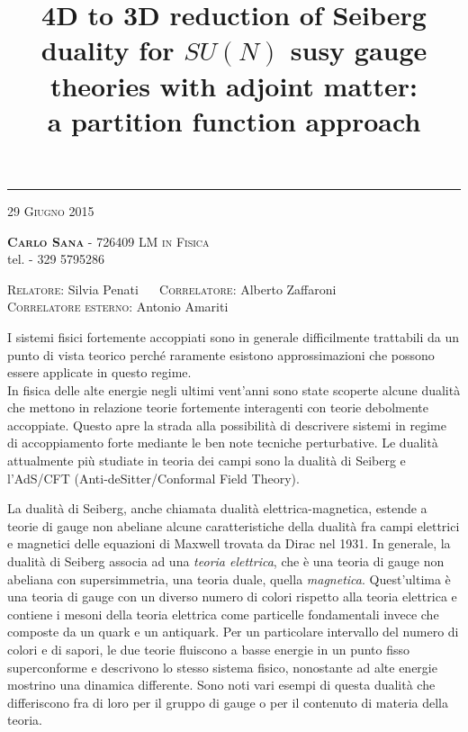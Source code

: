 \documentclass[a4paper,oneside,11pt]{article}
\date{}
\title{\boldmath \textbf{4D to 3D reduction of Seiberg duality for $SU(N)$ susy gauge theories with adjoint matter: \\  a partition function approach }
 }
\author{}
\begin{document}
\maketitle
\vspace*{-2.3cm}

\begin{center}
\rule{\textwidth}{0.5pt}
\scshape {29 Giugno 2015} \\
 \end{center}
\vspace{-0.3cm}
	 \textbf{\noindent%
	 \scshape%
	 Carlo Sana} - \textsf{726409}  \hfill
 {\scshape LM in Fisica} 
\\
 \noindent tel. \textsf{- 329 5795286}\\
 \vspace{-0.5cm}
\begin{center}
{ \scshape  Relatore}: 
\textsf{Silvia Penati} 
~~
{ \scshape  Correlatore}:
\textsf{Alberto Zaffaroni}
\\
{ \scshape  Correlatore esterno}:
\textsf{Antonio Amariti}

\end{center}

I sistemi fisici fortemente accoppiati sono in generale difficilmente trattabili da un punto di vista teorico perché raramente esistono approssimazioni che possono essere applicate in questo regime.\\
In fisica delle alte energie negli ultimi vent'anni sono state scoperte alcune dualità che mettono in relazione teorie fortemente interagenti con teorie debolmente accoppiate.
Questo apre la strada alla possibilità di descrivere sistemi in regime di accoppiamento forte mediante le ben note tecniche perturbative.
Le dualità attualmente più studiate in teoria dei campi sono la dualità di Seiberg e l'AdS/CFT (Anti-deSitter/Conformal Field Theory).

La dualità di Seiberg, anche chiamata dualità elettrica-magnetica, estende a teorie di gauge non abeliane alcune caratteristiche della dualità fra campi elettrici e magnetici delle equazioni di Maxwell trovata da Dirac nel 1931. 
In generale, la dualità di Seiberg associa ad una \emph{teoria elettrica}, che è una teoria di gauge non abeliana con supersimmetria, una teoria duale, quella \emph{magnetica}.
Quest'ultima è una teoria di gauge con un diverso numero di colori rispetto alla teoria elettrica e contiene i mesoni della teoria elettrica come particelle fondamentali invece che composte da un quark e un antiquark.
Per un particolare intervallo del numero di colori e di sapori, le due teorie fluiscono a basse energie in un punto fisso superconforme e descrivono lo stesso sistema fisico, nonostante ad alte energie mostrino una dinamica differente.
Sono noti vari esempi di questa dualità che differiscono fra di loro per il gruppo di gauge o per il contenuto di materia della teoria.
\end{document}
